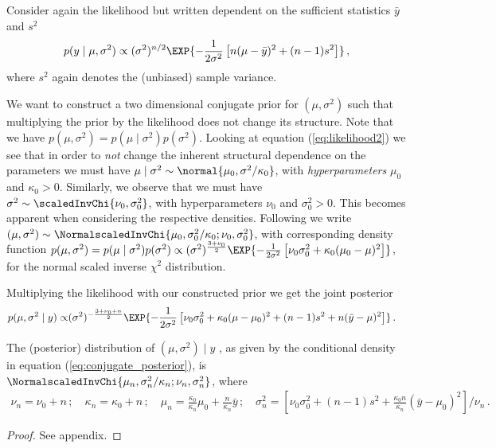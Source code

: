 Consider again the likelihood but written dependent on the sufficient statistics $\bar{y}$ and $s^2$
\begin{align}
  p(y \mid \mu, \sigma^2) \propto (\sigma^2)^{n/2} \EXP{-\frac{1}{2\sigma^2} \left[ n(\mu - \bar{y})^2 + (n-1)s^2 \right]} \,,
  \label{eq:likelihood2}
\end{align}
where $s^2$ again denotes the (unbiased) sample variance.

We want to construct a two dimensional conjugate prior for $(\mu, \sigma^2)$ such that multiplying the prior by the likelihood does not change its structure.
Note that we have $p(\mu, \sigma^2) = p(\mu \mid \sigma^2) p(\sigma^2)$.
Looking at equation (\ref{eq:likelihood2}) we see that in order to \emph{not} change the inherent structural dependence on the parameters we must have $\mu \mid \sigma^2 \sim \normal{\mu_0, \sigma^2 / \kappa_0}$, with \emph{hyperparameters} $\mu_0$ and $\kappa_0 > 0$.
Similarly, we observe that we must have $\sigma^2 \sim \scaledInvChi{\nu_0, \sigma_0^2}$, with hyperparameters $\nu_0$ and $\sigma_0^2 > 0$.
This becomes apparent when considering the respective densities.
Following \citet{gelmanbda04} we write $(\mu, \sigma^2) \sim \NormalscaledInvChi{\mu_0, \sigma_0^2 / \kappa_0; \nu_0, \sigma_0^2}$, with corresponding density function $p(\mu, \sigma^2) = p(\mu \mid \sigma^2) p(\sigma^2) \propto (\sigma^2)^{\frac{3 + \nu_0}{2}} \EXP{-\frac{1}{2\sigma^2} \left[\nu_0 \sigma_0^2 + \kappa_0(\mu_0 - \mu)^2 \right]}$, for the normal scaled inverse $\chi^2$ distribution.

Multiplying the likelihood with our constructed prior we get the joint posterior
\begin{align}
  p(\mu, \sigma^2 \mid y) \propto& (\sigma^2)^{-\frac{3 + \nu_0 + n}{2}} \EXP{-\frac{1}{2 \sigma^2} \left[\nu_0\sigma_0^2 + \kappa_0(\mu - \mu_0)^2 + (n-1)s^2 + n(\bar{y} - \mu)^2 \right]} \,.
  \label{eq:conjugate_posterior}
\end{align}

\begin{proposition}
  The (posterior) distribution of $(\mu, \sigma^2) \mid y$ , as given by the conditional density in equation (\ref{eq:conjugate_posterior}), is\\ $\NormalscaledInvChi{\mu_n, \sigma_n^2/\kappa_n; \nu_n, \sigma_n^2}$, where
  \begin{align*}
    \nu_n = \nu_0 + n \,; \quad \kappa_n = \kappa_0 + n \,; \quad \mu_n =\frac{\kappa_0}{\kappa_n}\mu_0 + \frac{n}{\kappa_n}\bar{y} \,; \quad \sigma_n^2 = \left[\nu_0 \sigma_0^2 + (n-1)s^2 + \frac{\kappa_0 n}{\kappa_n} (\bar{y} - \mu_0)^2\right] /\nu_n \,.
  \end{align*}
  \label{prop:posterior_conjugate}
\end{proposition}
\begin{proof}
  See appendix.
\end{proof}

